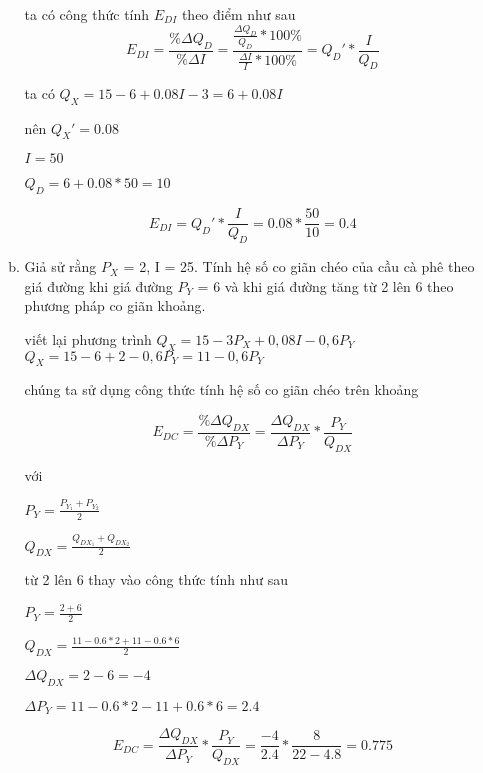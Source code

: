 \begin{enumerate}
\begin{enumerate}[a.]
                ta có công thức tính $E_{DI}$ theo điểm như sau
                \[ E_{DI} =
                  \frac{\% \Delta Q_D}{\% \Delta I}
                  = \frac{\frac{\Delta Q_D}{Q_D} * 100 \% }{\frac{\Delta I}{I} * 100 \% }
                  = Q_D' * \frac{I}{Q_D}
                \]

                ta có $Q_X = 15 - 6 + 0.08I - 3 = 6 + 0.08I$

                nên  $Q_X' = 0.08$

                $ I = 50$

                $ Q_D = 6 + 0.08 * 50 = 10$

                \[ E_{DI} =
                  Q_D' * \frac{I}{Q_D}
                  = 0.08 * \frac{50}{10}
                  = 0.4
                \]


          \item Giả sử rằng $P_X$ = 2, I = 25. Tính hệ số co giãn chéo của cầu cà phê theo giá đường khi
                giá đường $P_Y$ = 6 và khi giá đường tăng từ 2 lên 6 theo phương pháp co giãn khoảng.

                viết lại phương trình  $Q_X = 15 - 3P_X + 0,08I - 0,6P_Y$ \\
                $Q_X = 15 - 6 + 2 - 0,6P_Y = 11 - 0,6P_Y$

                chúng ta sử dụng công thức tính hệ số co giãn chéo trên khoảng

                \[ E_{DC} = \frac{\% \Delta Q_{DX}}{\% \Delta P_{Y}}
                  =  \frac{ \Delta Q_{DX}}{\Delta P_{Y}} * \frac{P_{Y}}{Q_{DX}} \]

                với

                $P_{Y} = \frac{P_{Y_1} + P_{Y_2}}{2}$

                $Q_{DX} = \frac{Q_{DX_1} + Q_{DX_2}}{2}$

                từ 2 lên 6
                thay vào công thức tính như sau

                $P_{Y} = \frac{2 +6 }{2}$

                $Q_{DX} = \frac{11 - 0.6 * 2 + 11 - 0.6 * 6}{2}$

                $\Delta Q_{DX} = 2 - 6 = -4$

                $\Delta P_{Y} = 11 - 0.6 * 2 - 11 + 0.6 * 6 = 2.4$

                \[ E_{DC} = \frac{ \Delta Q_{DX}}{\Delta P_{Y}} * \frac{P_{Y}}{Q_{DX}}
                  = \frac{-4}{2.4} * \frac{8}{22 - 4.8} = 0.775 \]



\end{enumerate}
\end{enumerate}
